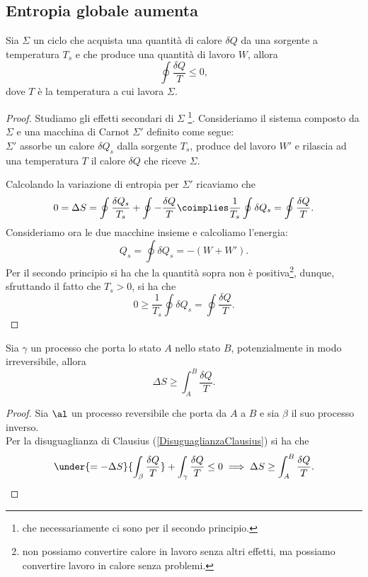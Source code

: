 \subsection{Entropia globale aumenta}
\begin{proposition}\label{DisuguaglianzaClausius}
Sia $\Sigma$ un ciclo che acquista una quantit\`a di calore $\delta Q$ da una sorgente a temperatura $T_s$ e che produce una quantit\`a di lavoro $W$, allora \[\oint \frac{\delta Q}T\leq 0,\]
dove $T$ \`e la temperatura a cui lavora $\Sigma$.
\end{proposition}
\begin{proof}
Studiamo gli effetti secondari di $\Sigma$ \footnote{che necessariamente ci sono per il secondo principio.}.
Consideriamo il sistema composto da $\Sigma$ e una macchina di Carnot $\Sigma'$ definito come segue:\\
$\Sigma'$ assorbe un calore $\delta Q_s$ dalla sorgente $T_s$, produce del lavoro $W'$ e rilascia ad una temperatura $T$ il calore $\delta Q$ che riceve $\Sigma$.
\medskip

\noindent Calcolando la variazione di entropia per $\Sigma'$ ricaviamo che
\[0=\Delta S=\oint \frac{\delta Q_s}{T_s}+\oint -\frac{\delta Q}T\coimplies \frac1{T_s}\oint \delta Q_s=\oint \frac{\delta Q}T.\]
Consideriamo ora le due macchine insieme e calcoliamo l'energia:
\[Q_s=\oint \delta Q_s=-(W+W').\]
Per il secondo principio si ha che la quantit\`a sopra non \`e positiva\footnote{non possiamo convertire calore in lavoro senza altri effetti, ma possiamo convertire lavoro in calore senza problemi.}, dunque, sfruttando il fatto che $T_s>0$, si ha che
\[0\geq \frac1{T_s}\oint \delta Q_s=\oint \frac{\delta Q}T.\]
\end{proof}



\begin{theorem}\label{VariazioneEntropiaSuperaIntegrale}
Sia $\gamma$ un processo che porta lo stato $A$ nello stato $B$, potenzialmente in modo irreversibile, allora
\[\Delta S\geq \int_A^B\frac{\delta Q}T.\]
\end{theorem}
\begin{proof}
Sia $\al$ un processo reversibile che porta da $A$ a $B$ e sia $\beta$ il suo processo inverso.\\
Per la disuguaglianza di Clausius (\ref{DisuguaglianzaClausius}) si ha che
\[\under{=-\Delta S}{\int_\beta\frac{\delta Q}T}+\int_\gamma\frac{\delta Q}T\leq 0\implies \Delta S\geq \int_A^B\frac{\delta Q}T.\]
\end{proof}




